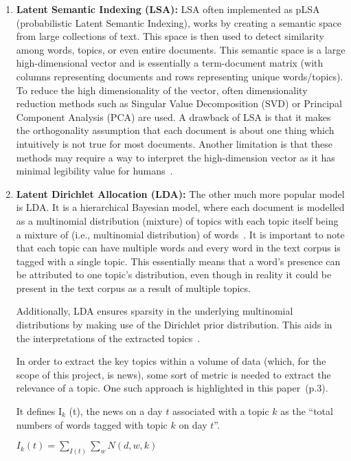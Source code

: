 \begin{enumerate}
    \item \textbf{Latent Semantic Indexing (LSA):} LSA often implemented as pLSA (probabilistic Latent Semantic Indexing), works by creating a semantic space from large collections of text. This space is then used to detect similarity among words, topics, or even entire documents. This semantic space is a large high-dimensional vector and is essentially a term-document matrix (with columns representing documents and rows representing unique words/topics). To reduce the high dimensionality of the vector, often dimensionality reduction methods such as Singular Value Decomposition (SVD) or Principal Component Analysis (PCA) are used. A drawback of LSA is that it makes the orthogonality assumption that each document is about one thing which intuitively is not true for most documents. Another limitation is that these methods may require a way to interpret the high-dimension vector as it has minimal legibility value for humans~\cite{24_rinaldi2021semantic}.
    
    \item \textbf{Latent Dirichlet Allocation (LDA):} The other much more popular model is LDA. It is a hierarchical Bayesian model, where each document is modelled as a multinomial distribution (mixture) of topics with each topic itself being a mixture of (i.e., multinomial distribution) of words~\cite{25_lda}. It is important to note that each topic can have multiple words and every word in the text corpus is tagged with a single topic. This essentially means that a word's presence can be attributed to one topic's distribution, even though in reality it could be present in the text corpus as a result of multiple topics. 
    
    Additionally, LDA ensures sparsity in the underlying multinomial distributions by making use of the Dirichlet prior distribution. This aids in the interpretations of the extracted topics~\cite{23_topic_extraction}.

    In order to extract the key topics within a volume of data (which, for the scope of this project, is news), some sort of metric is needed to extract the relevance of a topic.   
One such approach is highlighted in this paper~\cite{23_topic_extraction}(p.3).

It defines I$_{k}$ (t), the news on a day $t$ associated with a topic $k$ as the  ``total numbers of words tagged with topic $k$ on day $t$''. 

\begin{center}
    $ I_{k} (t) = \sum_{I(t)} \sum_{w} N (d, w, k) $
\end{center}


\end{enumerate}
